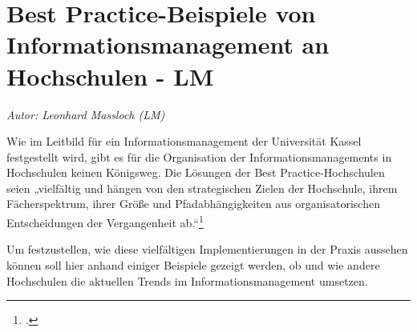 \chapter{Best Practice-Beispiele von Informationsmanagement an Hochschulen - LM}
\label{chapter_best_practice_beispiele}
\textit{Autor: Leonhard Massloch (LM)}

Wie im Leitbild für ein Informationsmanagement der Universität Kassel festgestellt wird, gibt es für die Organisation der Informationsmanagements in Hochschulen keinen Königsweg. Die Lösungen der Best Practice-Hochschulen seien „vielfältig und hängen von den strategischen Zielen der Hochschule, ihrem Fächerspektrum, ihrer Größe und Pfadabhängigkeiten aus organisatorischen Entscheidungen der Vergangenheit ab.“\footcite{unikassel_leitbild_oD}

Um festzustellen, wie diese vielfältigen Implementierungen in der Praxis aussehen können soll hier anhand einiger Beispiele gezeigt werden, ob und wie andere Hochschulen die aktuellen Trends im Informationsmanagement umsetzen.



